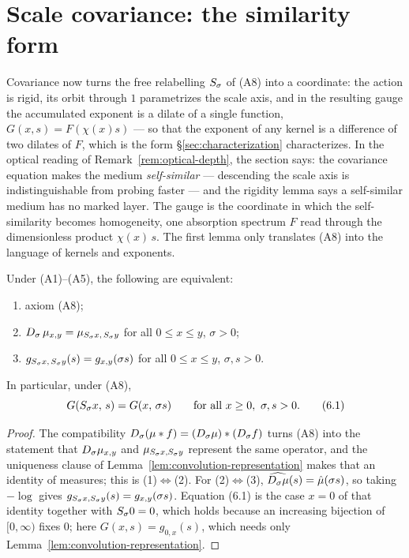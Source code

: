 
\section{Scale covariance: the similarity form}\label{sec:covariance}

Covariance now turns the free relabelling $S_\sigma$ of (A8) into a coordinate: the
action is rigid, its orbit through $1$ parametrizes the scale axis, and in the resulting
gauge the accumulated exponent is a dilate of a single function, $G(x,s) = F(\chi(x)s)$ ---
so that the exponent of any kernel is a difference of two dilates of $F$, which is the form
\S\ref{sec:characterization} characterizes. In the optical reading of
Remark~\ref{rem:optical-depth}, the section says: the covariance equation makes the medium
\emph{self-similar} --- descending the scale axis is indistinguishable from probing faster
--- and the rigidity lemma says a self-similar medium has no marked layer. The gauge is the
coordinate in which the self-similarity becomes homogeneity, one absorption spectrum $F$
read through the dimensionless product $\chi(x)\,s$. The first lemma only translates (A8)
into the language of kernels and exponents.

\begin{lemma}\label{lem:covariance-laplace}
Under (A1)--(A5), the following are equivalent:
\begin{enumerate}
\item axiom (A8);
\item $D_\sigma\,\mu_{x,y} = \mu_{S_\sigma x,\,S_\sigma y}$ for all
$0 \le x \le y$, $\sigma > 0$;
\item $g_{S_\sigma x,\,S_\sigma y}(s) = g_{x,y}(\sigma s)$ for all
$0 \le x \le y$, $\sigma, s > 0$.
\end{enumerate}
In particular, under (A8),
\[
  G(S_\sigma x,\, s) = G(x,\, \sigma s)
  \qquad \text{for all } x \ge 0,\ \sigma, s > 0. \tag{6.1}
\]
\end{lemma}

\begin{proof}
The compatibility $D_\sigma(\mu * f) = (D_\sigma\mu) * (D_\sigma f)$ turns (A8) into
the statement that $D_\sigma\mu_{x,y}$ and $\mu_{S_\sigma x, S_\sigma y}$ represent
the same operator, and the uniqueness clause of Lemma~\ref{lem:convolution-representation}
makes that an identity of measures; this is (1)$\Leftrightarrow$(2). For (2)$\Leftrightarrow$(3),
$\widehat{D_\sigma\mu}(s) = \hat\mu(\sigma s)$, so taking $-\log$ gives
$g_{S_\sigma x, S_\sigma y}(s) = g_{x,y}(\sigma s)$. Equation (6.1) is the case
$x = 0$ of that identity together with $S_\sigma 0 = 0$, which holds because an increasing
bijection of $[0,\infty)$ fixes $0$; here $G(x,s) = g_{0,x}(s)$, which needs only
Lemma~\ref{lem:convolution-representation}.
\end{proof}

